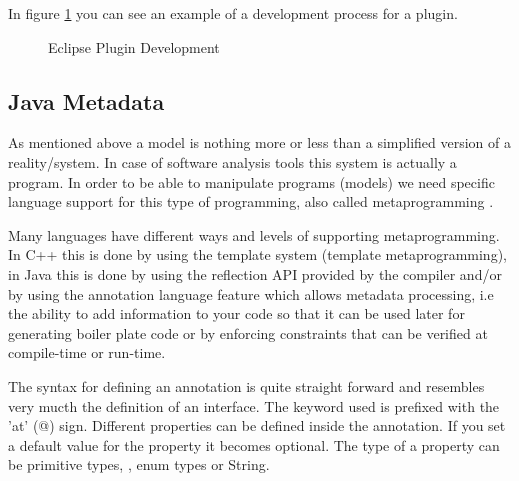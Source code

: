 	In figure \ref{fig:eclipsePlugin} you can see an example of a development
process for a plugin.

\begin{figure}[h]
\centering
{}
\caption{Eclipse Plugin Development \cite{figure:eclipsePlugin}}
\label{fig:eclipsePlugin}
\end{figure}	

\subsection{Java Metadata}\label{ch:2.1.2}

	
	As mentioned above a model is nothing more or less than a simplified version of
a reality/system. In case of software analysis tools this system is actually a
program. In order to be able to manipulate programs (models) we need specific
language support for this type of programming, also called metaprogramming
\cite{website:metaprogramming}. 

	Many languages have different ways and levels of supporting metaprogramming.
In C++ this is done by using the template system (template metaprogramming), in
Java this is done by using the reflection API provided by the compiler and/or by using the annotation
language feature which allows metadata processing, i.e the ability to add
information to your code so that it can be used later for generating boiler
plate code or by enforcing constraints that can be verified at compile-time or
run-time. \cite{book:ThinkingInJava} 
	
	The syntax for defining an annotation is quite straight forward and resembles
very mucth the definition of an interface. The keyword used is 
prefixed with the 'at' (@) sign. Different properties can be defined inside the annotation. If you set a default
value for the property it becomes optional. The type of a property can be 
primitive types, , enum types or String.
	

